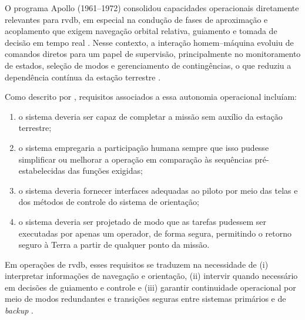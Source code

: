O programa Apollo (1961--1972) consolidou capacidades operacionais diretamente relevantes para \gls{rvdb}, em especial na condução de fases de aproximação e acoplamento que exigem navegação orbital relativa, guiamento e tomada de decisão em tempo real \cite{RVDBapollo}.
Nesse contexto, a interação homem--máquina evoluiu de comandos diretos para um papel de supervisão, principalmente no monitoramento de estados, seleção de modos e gerenciamento de contingências, o que reduziu a dependência contínua da estação terrestre \cite{nevins1971}.

Como descrito por \cite{nevins1971}, requisitos associados a essa autonomia operacional incluíam:
\begin{enumerate}[label=(\roman*)]
    \item o sistema deveria ser capaz de completar a missão sem auxílio da estação terrestre;
    \item o sistema empregaria a participação humana sempre que isso pudesse simplificar ou melhorar a operação em comparação às sequências pré-estabelecidas das funções exigidas;
    \item o sistema deveria fornecer interfaces adequadas ao piloto por meio das telas e dos métodos de controle do sistema de orientação;
    \item o sistema deveria ser projetado de modo que as tarefas pudessem ser executadas por apenas um operador, de forma segura, permitindo o retorno seguro à Terra a partir de qualquer ponto da missão.
\end{enumerate}

Em operações de \gls{rvdb}, esses requisitos se traduzem na necessidade de (i) interpretar informações de navegação e orientação, (ii) intervir quando necessário em decisões de guiamento e controle e (iii) garantir continuidade operacional por meio de modos redundantes e transições seguras entre sistemas primários e de \emph{backup} \cite{nevins1971}.
